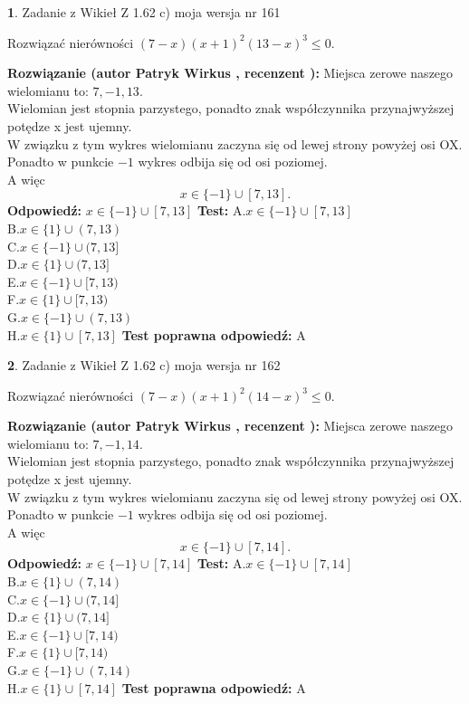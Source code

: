 \documentclass[12pt, a4paper]{article}
\theoremstyle{definition} %
\newtheorem{zad}{}
\newcommand{\zadStart}[1]{\begin{zad}#1\newline}
\newcommand{\zadStop}{\end{zad}}
\newcommand{\rozwStart}[2]{\noindent \textbf{Rozwiązanie (autor #1 , recenzent #2): }\newline}
\newcommand{\rozwStop}{\newline}
\newcommand{\odpStart}{\noindent \textbf{Odpowiedź:}\newline}
\newcommand{\odpStop}{\newline}
\newcommand{\testStart}{\noindent \textbf{Test:}\newline}
\newcommand{\testStop}{\newline}
\newcommand{\kluczStart}{\noindent \textbf{Test poprawna odpowiedź:}\newline}
\newcommand{\kluczStop}{\newline}
\begin{document}
\zadStart{Zadanie z Wikieł Z 1.62 c) moja wersja nr 161}

Rozwiązać nierówności $(7-x)(x+1)^{2}(13-x)^{3}\le0$.
\zadStop
\rozwStart{Patryk Wirkus}{}
Miejsca zerowe naszego wielomianu to: $7, -1, 13$.\\
Wielomian jest stopnia parzystego, ponadto znak współczynnika przy\linebreak najwyższej potędze x jest ujemny.\\ W związku z tym wykres wielomianu zaczyna się od lewej strony powyżej osi OX.\\
Ponadto w punkcie $-1$ wykres odbija się od osi poziomej.\\
A więc $$x \in \{-1\} \cup [7,13].$$
\rozwStop
\odpStart
$x \in \{-1\} \cup [7,13]$
\odpStop
\testStart
A.$x \in \{-1\} \cup [7,13]$\\
B.$x \in \{1\} \cup (7,13)$\\
C.$x \in \{-1\} \cup (7,13]$\\
D.$x \in \{1\} \cup (7,13]$\\
E.$x \in \{-1\} \cup [7,13)$\\
F.$x \in \{1\} \cup [7,13)$\\
G.$x \in \{-1\} \cup (7,13)$\\
H.$x \in \{1\} \cup [7,13]$
\testStop
\kluczStart
A
\kluczStop



\zadStart{Zadanie z Wikieł Z 1.62 c) moja wersja nr 162}

Rozwiązać nierówności $(7-x)(x+1)^{2}(14-x)^{3}\le0$.
\zadStop
\rozwStart{Patryk Wirkus}{}
Miejsca zerowe naszego wielomianu to: $7, -1, 14$.\\
Wielomian jest stopnia parzystego, ponadto znak współczynnika przy\linebreak najwyższej potędze x jest ujemny.\\ W związku z tym wykres wielomianu zaczyna się od lewej strony powyżej osi OX.\\
Ponadto w punkcie $-1$ wykres odbija się od osi poziomej.\\
A więc $$x \in \{-1\} \cup [7,14].$$
\rozwStop
\odpStart
$x \in \{-1\} \cup [7,14]$
\odpStop
\testStart
A.$x \in \{-1\} \cup [7,14]$\\
B.$x \in \{1\} \cup (7,14)$\\
C.$x \in \{-1\} \cup (7,14]$\\
D.$x \in \{1\} \cup (7,14]$\\
E.$x \in \{-1\} \cup [7,14)$\\
F.$x \in \{1\} \cup [7,14)$\\
G.$x \in \{-1\} \cup (7,14)$\\
H.$x \in \{1\} \cup [7,14]$
\testStop
\kluczStart
A
\kluczStop
\end{document}
